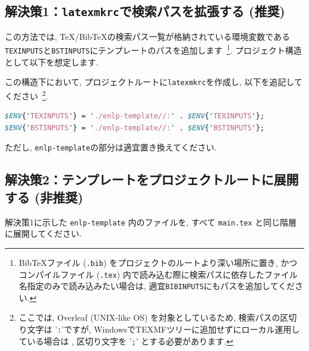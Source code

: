 \documentclass{ltjsarticle}
\begin{document}
\subsection{解決策1：\texttt{latexmkrc}で検索パスを拡張する (推奨)}
この方法では, TeX/BibTeXの検索パス一覧が格納されている環境変数である\texttt{TEXINPUTS}と\texttt{BSTINPUTS}にテンプレートのパスを追加します~\footnote{BibTeXファイル (\texttt{.bib}) をプロジェクトのルートより深い場所に置き, かつコンパイルファイル (\texttt{.tex}) 内で読み込む際に検索パスに依存したファイル名指定のみで読み込みたい場合は, 適宜\texttt{BIBINPUTS}にもパスを追加してください.}. 
プロジェクト構造として以下を想定します.
\par\noindent\begin{minipage}{\linewidth}\small
\setlength{\DTbaselineskip}{\baselineskip}
\end{minipage}\par
\noindent
この構造下において, プロジェクトルートに\texttt{latexmkrc}を作成し, 以下を追記してください~\footnote{ここでは, Overleaf (UNIX-like OS) を対象としているため, 検索パスの区切り文字は '\texttt{:}'ですが, WindowsでTEXMFツリーに追加せずにローカル運用している場合は
, 区切り文字を '\texttt{;}' とする必要があります.}.
\begin{lstlisting}[language=Perl]
$ENV{'TEXINPUTS'} = './enlp-template//:' . $ENV{'TEXINPUTS'};
$ENV{'BSTINPUTS'} = './enlp-template//:' . $ENV{'BSTINPUTS'};
\end{lstlisting}
ただし, \texttt{enlp-template}の部分は適宜置き換えてください.
\subsection{解決策2：テンプレートをプロジェクトルートに展開する (非推奨)}
解決策1に示した \texttt{enlp-template} 内のファイルを, すべて \texttt{main.tex} と同じ階層に展開してください. 
\end{document}
